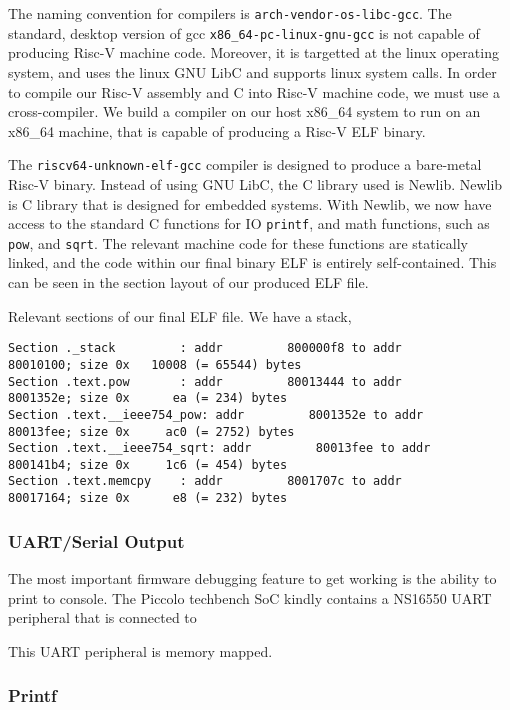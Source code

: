 \documentclass[a4paper,9pt]{report}
\begin{document}
The naming convention for compilers is \texttt{arch-vendor-os-libc-gcc}. The
standard, desktop version of gcc \texttt{x86\_64-pc-linux-gnu-gcc} is not
capable of producing Risc-V machine code. Moreover, it is targetted at the linux
operating system, and uses the linux GNU LibC and supports linux system calls.
In order to compile our Risc-V assembly and C into Risc-V machine code, we must
use a cross-compiler. We build a compiler on our host x86\_64 system to run on
an x86\_64 machine, that is capable of producing a Risc-V ELF binary.

The \texttt{riscv64-unknown-elf-gcc} compiler is designed to produce a
bare-metal Risc-V binary. Instead of using GNU LibC, the C library used is
Newlib. Newlib is C library that is designed for embedded systems. With Newlib,
we now have access to the standard C functions for IO \texttt{printf}, and math
functions, such as \texttt{pow}, and \texttt{sqrt}. The relevant machine code
for these functions are statically linked, and the code within our final binary
ELF is entirely self-contained. This can be seen in the section layout of our
produced ELF file.

Relevant sections of our final ELF file. We have a stack,  
\tiny
\begin{verbatim}
Section ._stack         : addr         800000f8 to addr         80010100; size 0x   10008 (= 65544) bytes
Section .text.pow       : addr         80013444 to addr         8001352e; size 0x      ea (= 234) bytes
Section .text.__ieee754_pow: addr         8001352e to addr         80013fee; size 0x     ac0 (= 2752) bytes
Section .text.__ieee754_sqrt: addr         80013fee to addr         800141b4; size 0x     1c6 (= 454) bytes
Section .text.memcpy    : addr         8001707c to addr         80017164; size 0x      e8 (= 232) bytes
\end{verbatim}
\normalsize



\subsubsection{UART/Serial Output}
The most important firmware debugging feature to get working is the ability to
print to console. The Piccolo techbench SoC kindly contains a NS16550 UART
peripheral that is connected to 

This UART peripheral is memory mapped. 

\subsubsection{Printf}
\end{document}
